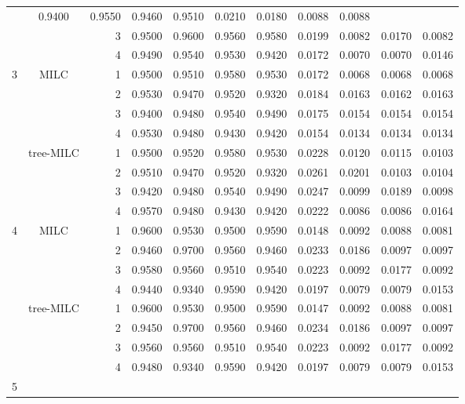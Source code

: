 \documentclass[a4paper, 11pt]{article} %
\begin{document}
\begin{table}[ht]
\begin{tabular}{cc r llll  rrrr }
&  0.9400 & 0.9550 & 0.9460 & 0.9510 
 & 0.0210 & 0.0180 & 0.0088 & 0.0088 \\
   &&3 
  & 0.9500 & 0.9600 & 0.9560 & 0.9580
& 0.0199 & 0.0082 & 0.0170 & 0.0082 \\  
  &&4  
 & 0.9490 & 0.9540 & 0.9530 & 0.9420 
& 0.0172 & 0.0070 & 0.0070 & 0.0146 \\ 
 \hline
    \hline
  \multirow{8}{*}{3}
   & \multirow{4}{*}{MILC}
 & 1    & 0.9500 & 0.9510 & 0.9580 & 0.9530
 & 0.0172 & 0.0068 & 0.0068 & 0.0068 \\
  &&2 &0.9530 & 0.9470 & 0.9520 & 0.9320
  & 0.0184 & 0.0163 & 0.0162 & 0.0163 \\
  &&3 & 0.9400 & 0.9480 & 0.9540 & 0.9490
  & 0.0175 & 0.0154 & 0.0154 & 0.0154 \\ 
  &&4& 0.9530 & 0.9480 & 0.9430 & 0.9420 
  & 0.0154 & 0.0134 & 0.0134 & 0.0134 \\    
 \cline{2-11}
   &\multirow{4}{*}{tree-MILC}
 & 1    & 0.9500 & 0.9520 & 0.9580 & 0.9530
 & 0.0228 & 0.0120 & 0.0115 & 0.0103 \\
  &&2 &0.9510 & 0.9470 & 0.9520 & 0.9320
  & 0.0261 & 0.0201 & 0.0103 & 0.0104 \\ 
  &&3 & 0.9420 & 0.9480 & 0.9540 & 0.9490
  & 0.0247 & 0.0099 & 0.0189 & 0.0098 \\ 
  &&4& 0.9570 & 0.9480 & 0.9430 & 0.9420 
  & 0.0222 & 0.0086 & 0.0086 & 0.0164 \\ 
    \hline
    \hline
    \multirow{8}{*}{4}
   & \multirow{4}{*}{MILC}
& 1    & 0.9600 & 0.9530 & 0.9500 & 0.9590
& 0.0148 & 0.0092 & 0.0088 & 0.0081 \\ 
  &&2 & 0.9460 & 0.9700 & 0.9560 & 0.9460
   & 0.0233 & 0.0186 & 0.0097 & 0.0097 \\
  &&3 & 0.9580 & 0.9560 & 0.9510 & 0.9540
  & 0.0223 & 0.0092 & 0.0177 & 0.0092 \\ 
  &&4& 0.9440 & 0.9340 & 0.9590 & 0.9420
 & 0.0197 & 0.0079 & 0.0079 & 0.0153 \\  
 \cline{2-11}
   &\multirow{4}{*}{tree-MILC}
& 1    & 0.9600 & 0.9530 & 0.9500 & 0.9590
& 0.0147 & 0.0092 & 0.0088 & 0.0081 \\ 
  &&2 & 0.9450 & 0.9700 & 0.9560 & 0.9460
  & 0.0234 & 0.0186 & 0.0097 & 0.0097 \\
  &&3 & 0.9560 & 0.9560 & 0.9510 & 0.9540
& 0.0223 & 0.0092 & 0.0177 & 0.0092 \\
  &&4& 0.9480 & 0.9340 & 0.9590 & 0.9420
  & 0.0197 & 0.0079 & 0.0079 & 0.0153 \\ 
    \hline
   \multirow{8}{*}{5}

\end{tabular}
\end{table}
\end{document}
